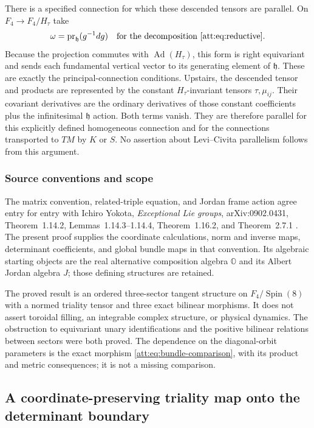 \documentclass[11pt]{article}
\theoremstyle{definition}
\begin{document}
There is a specified connection for which these descended tensors
are parallel. On $F_4\to F_4/H_\tau$ take
\[
 \omega=\operatorname{pr}_{\mathfrak h}(g^{-1}dg)
 \quad\text{for the decomposition }\eqref{att:eq:reductive}.
\]
Because the projection commutes with $\operatorname{Ad}(H_\tau)$,
this form is right equivariant and sends each fundamental vertical
vector to its generating element of $\mathfrak h$. These are exactly
the principal-connection conditions. Upstairs, the descended tensor
and products are represented by the constant $H_\tau$-invariant
tensors $\tau,\mu_{ij}$. Their covariant derivatives are the
ordinary derivatives of those constant coefficients plus the
infinitesimal $\mathfrak h$ action. Both terms vanish.
They are therefore parallel for this explicitly defined homogeneous
connection and for the connections transported to $TM$ by $K$ or $S$.
No assertion about Levi--Civita parallelism follows from this argument.

\subsubsection{Source conventions and scope}

The matrix convention, related-triple equation, and Jordan frame
action agree entry for entry with Ichiro Yokota,
\emph{Exceptional Lie groups}, arXiv:0902.0431,
Theorem~1.14.2, Lemmas~1.14.3--1.14.4, Theorem~1.16.2, and
Theorem~2.7.1 \cite{Yokota2009}. The present proof supplies the coordinate calculations,
norm and inverse maps, determinant coefficients, and global bundle
maps in that convention. Its algebraic starting objects are the
real alternative composition algebra $\mathbb O$ and its Albert
Jordan algebra $J$; those defining structures are retained.

The proved result is an ordered three-sector tangent structure on
$F_4/\operatorname{Spin}(8)$ with a normed triality tensor and three
exact bilinear morphisms. It does not assert toroidal filling,
an integrable complex structure, or physical dynamics.
The obstruction to equivariant unary identifications and the
positive bilinear relations between sectors were both proved.
The dependence on the diagonal-orbit parameters is the exact
morphism \eqref{att:eq:bundle-comparison}, with its product and metric
consequences; it is not a missing comparison.


\subsection{A coordinate-preserving triality map onto the determinant boundary}
\label{tri:sec:spectral-graph}
\end{document}
